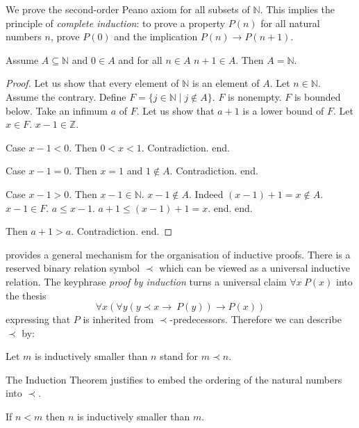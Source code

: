 \documentclass{article}
\begin{document}
We prove the second-order Peano axiom for all subsets of $\mathbb{N}$.
This implies the principle of {\em complete induction}: to prove a 
property $P(n)$ for all natural numbers $n$, prove $P(0)$ and
the implication $P(n) \rightarrow P(n+1)$. 
%
\begin{forthel}

\begin{theorem}
Assume $A \subseteq \mathbb{N}$
and $0 \in A$ and for all $n \in A$ $n + 1 \in A$.
Then $A = \mathbb{N}$.
\end{theorem}

\begin{proof}
Let us show that every element of $\mathbb{N}$ is an element of $A$.
	Let $n \in \mathbb{N}$.
	Assume the contrary.
	Define $F = \{  j \in \mathbb{N} \mid j \notin A\}$.
	$F$ is nonempty. $F$ is bounded below.
  Take an infimum $a$ of $F$.
	Let us show that $a+1$ is a lower bound of $F$.
		Let $x \in F$. $x - 1 \in \mathbb{Z}$.

		Case $x - 1 < 0$. Then $0 < x < 1$. Contradiction. end.

		Case $x - 1 = 0$. Then $x = 1$ and $1 \notin A$. Contradiction. end.

		Case $x - 1 > 0$. Then $x - 1 \in \mathbb{N}$.
      $x - 1 \notin A$. Indeed $(x - 1) + 1 = x \notin A$. $x - 1 \in F$.
			$a \leq x - 1$.
			$a + 1 \leq (x - 1) + 1 = x$.
		end.
	end.

	Then $a+1 > a$.
	Contradiction.
end.
\end{proof}
\end{forthel}
%
\Naproche provides a general mechanism for the organisation of
inductive proofs. There is a reserved binary relation
symbol $\prec$ which can be viewed as a universal inductive relation.
The keyphrase {\em proof by induction} turns a universal
claim $\forall x \ P(x)$ into the thesis
$$\forall x (\forall y (y \prec x \rightarrow \ P(y)) \rightarrow P(x))$$
expressing that $P$ is inherited from $\prec$-predecessors.  
Therefore we can describe $\prec$ by:
%
\begin{forthel}
Let $m$ is inductively smaller than $n$ stand for $m \prec n$.
\end{forthel}
%
The Induction Theorem justifies to embed the ordering of the natural numbers
into $\prec$.
%
\begin{forthel}
\begin{axiom}
If $n < m$ then $n$ is inductively smaller than $m$.
\end{axiom}
\end{forthel}
\end{document}
